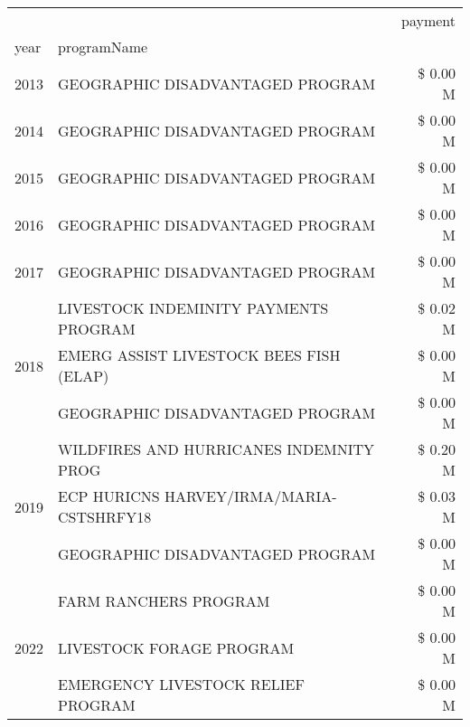 \begin{tabular}{llr}
\toprule
 &  & payment \\
year & programName &  \\
\midrule
2013 & GEOGRAPHIC DISADVANTAGED PROGRAM & \$ 0.00 M \\
\cline{1-3}
2014 & GEOGRAPHIC DISADVANTAGED PROGRAM & \$ 0.00 M \\
\cline{1-3}
2015 & GEOGRAPHIC DISADVANTAGED PROGRAM & \$ 0.00 M \\
\cline{1-3}
2016 & GEOGRAPHIC DISADVANTAGED PROGRAM & \$ 0.00 M \\
\cline{1-3}
2017 & GEOGRAPHIC DISADVANTAGED PROGRAM & \$ 0.00 M \\
\cline{1-3}
\multirow[t]{3}{*}{2018} & LIVESTOCK INDEMINITY PAYMENTS PROGRAM & \$ 0.02 M \\
 & EMERG ASSIST LIVESTOCK BEES FISH (ELAP) & \$ 0.00 M \\
 & GEOGRAPHIC DISADVANTAGED PROGRAM & \$ 0.00 M \\
\cline{1-3}
\multirow[t]{3}{*}{2019} & WILDFIRES AND HURRICANES INDEMNITY PROG & \$ 0.20 M \\
 & ECP HURICNS HARVEY/IRMA/MARIA-CSTSHRFY18 & \$ 0.03 M \\
 & GEOGRAPHIC DISADVANTAGED PROGRAM & \$ 0.00 M \\
\cline{1-3}
\multirow[t]{3}{*}{2022} & FARM RANCHERS PROGRAM & \$ 0.00 M \\
 & LIVESTOCK FORAGE PROGRAM & \$ 0.00 M \\
 & EMERGENCY LIVESTOCK RELIEF PROGRAM & \$ 0.00 M \\
\cline{1-3}
\bottomrule
\end{tabular}
